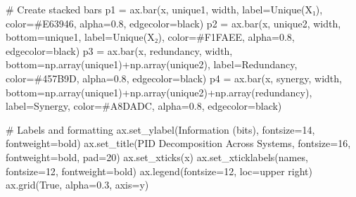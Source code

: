 \documentclass[
  11pt,
  letterpaper,
  oneside,
  openany]{book}
\newenvironment{Shaded}{\begin{snugshade}}{\end{snugshade}}
\newcommand{\CommentTok}[1]{\textcolor[rgb]{0.37,0.37,0.37}{#1}}
\newcommand{\DecValTok}[1]{\textcolor[rgb]{0.68,0.00,0.00}{#1}}
\newcommand{\FloatTok}[1]{\textcolor[rgb]{0.68,0.00,0.00}{#1}}
\newcommand{\NormalTok}[1]{\textcolor[rgb]{0.00,0.23,0.31}{#1}}
\newcommand{\OperatorTok}[1]{\textcolor[rgb]{0.37,0.37,0.37}{#1}}
\newcommand{\StringTok}[1]{\textcolor[rgb]{0.13,0.47,0.30}{#1}}
\newcommand{\VariableTok}[1]{\textcolor[rgb]{0.07,0.07,0.07}{#1}}
\begin{document}
\begin{Shaded}
\begin{Highlighting}[]
    \CommentTok{\# Create stacked bars}
\NormalTok{    p1 }\OperatorTok{=}\NormalTok{ ax.bar(x, unique1, width, label}\OperatorTok{=}\StringTok{\textquotesingle{}Unique(X₁)\textquotesingle{}}\NormalTok{, color}\OperatorTok{=}\StringTok{\textquotesingle{}\#E63946\textquotesingle{}}\NormalTok{, alpha}\OperatorTok{=}\FloatTok{0.8}\NormalTok{, edgecolor}\OperatorTok{=}\StringTok{\textquotesingle{}black\textquotesingle{}}\NormalTok{)}
\NormalTok{    p2 }\OperatorTok{=}\NormalTok{ ax.bar(x, unique2, width, bottom}\OperatorTok{=}\NormalTok{unique1, label}\OperatorTok{=}\StringTok{\textquotesingle{}Unique(X₂)\textquotesingle{}}\NormalTok{, color}\OperatorTok{=}\StringTok{\textquotesingle{}\#F1FAEE\textquotesingle{}}\NormalTok{, alpha}\OperatorTok{=}\FloatTok{0.8}\NormalTok{, edgecolor}\OperatorTok{=}\StringTok{\textquotesingle{}black\textquotesingle{}}\NormalTok{)}
\NormalTok{    p3 }\OperatorTok{=}\NormalTok{ ax.bar(x, redundancy, width, bottom}\OperatorTok{=}\NormalTok{np.array(unique1)}\OperatorTok{+}\NormalTok{np.array(unique2), }
\NormalTok{                label}\OperatorTok{=}\StringTok{\textquotesingle{}Redundancy\textquotesingle{}}\NormalTok{, color}\OperatorTok{=}\StringTok{\textquotesingle{}\#457B9D\textquotesingle{}}\NormalTok{, alpha}\OperatorTok{=}\FloatTok{0.8}\NormalTok{, edgecolor}\OperatorTok{=}\StringTok{\textquotesingle{}black\textquotesingle{}}\NormalTok{)}
\NormalTok{    p4 }\OperatorTok{=}\NormalTok{ ax.bar(x, synergy, width, bottom}\OperatorTok{=}\NormalTok{np.array(unique1)}\OperatorTok{+}\NormalTok{np.array(unique2)}\OperatorTok{+}\NormalTok{np.array(redundancy), }
\NormalTok{                label}\OperatorTok{=}\StringTok{\textquotesingle{}Synergy\textquotesingle{}}\NormalTok{, color}\OperatorTok{=}\StringTok{\textquotesingle{}\#A8DADC\textquotesingle{}}\NormalTok{, alpha}\OperatorTok{=}\FloatTok{0.8}\NormalTok{, edgecolor}\OperatorTok{=}\StringTok{\textquotesingle{}black\textquotesingle{}}\NormalTok{)}

    \CommentTok{\# Labels and formatting}
\NormalTok{    ax.set\_ylabel(}\StringTok{\textquotesingle{}Information (bits)\textquotesingle{}}\NormalTok{, fontsize}\OperatorTok{=}\DecValTok{14}\NormalTok{, fontweight}\OperatorTok{=}\StringTok{\textquotesingle{}bold\textquotesingle{}}\NormalTok{)}
\NormalTok{    ax.set\_title(}\StringTok{\textquotesingle{}PID Decomposition Across Systems\textquotesingle{}}\NormalTok{, fontsize}\OperatorTok{=}\DecValTok{16}\NormalTok{, fontweight}\OperatorTok{=}\StringTok{\textquotesingle{}bold\textquotesingle{}}\NormalTok{, pad}\OperatorTok{=}\DecValTok{20}\NormalTok{)}
\NormalTok{    ax.set\_xticks(x)}
\NormalTok{    ax.set\_xticklabels(names, fontsize}\OperatorTok{=}\DecValTok{12}\NormalTok{, fontweight}\OperatorTok{=}\StringTok{\textquotesingle{}bold\textquotesingle{}}\NormalTok{)}
\NormalTok{    ax.legend(fontsize}\OperatorTok{=}\DecValTok{12}\NormalTok{, loc}\OperatorTok{=}\StringTok{\textquotesingle{}upper right\textquotesingle{}}\NormalTok{)}
\NormalTok{    ax.grid(}\VariableTok{True}\NormalTok{, alpha}\OperatorTok{=}\FloatTok{0.3}\NormalTok{, axis}\OperatorTok{=}\StringTok{\textquotesingle{}y\textquotesingle{}}\NormalTok{)}


\end{Highlighting}
\end{Shaded}
\end{document}

